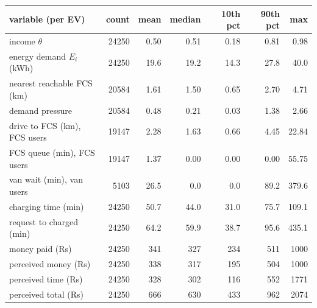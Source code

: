 \begin{tabular}{@{}lrrrrrr@{}}
\toprule
variable (per EV) & count & mean & median & 10th pct & 90th pct & max \\
\midrule
income $\theta$ & 24250 & 0.50 & 0.51 & 0.18 & 0.81 & 0.98 \\
energy demand $E_i$ (kWh) & 24250 & 19.6 & 19.2 & 14.3 & 27.8 & 40.0 \\
nearest reachable FCS (km) & 20584 & 1.61 & 1.50 & 0.65 & 2.70 & 4.71 \\
demand pressure & 20584 & 0.48 & 0.21 & 0.03 & 1.38 & 2.66 \\
drive to FCS (km), FCS users & 19147 & 2.28 & 1.63 & 0.66 & 4.45 & 22.84 \\
FCS queue (min), FCS users & 19147 & 1.37 & 0.00 & 0.00 & 0.00 & 55.75 \\
van wait (min), van users & 5103 & 26.5 & 0.0 & 0.0 & 89.2 & 379.6 \\
charging time (min) & 24250 & 50.7 & 44.0 & 31.0 & 75.7 & 109.1 \\
request to charged (min) & 24250 & 64.2 & 59.9 & 38.7 & 95.6 & 435.1 \\
money paid (Rs) & 24250 & 341 & 327 & 234 & 511 & 1000 \\
perceived money (Rs) & 24250 & 338 & 317 & 195 & 504 & 1000 \\
perceived time (Rs) & 24250 & 328 & 302 & 116 & 552 & 1771 \\
perceived total (Rs) & 24250 & 666 & 630 & 433 & 962 & 2074 \\
\bottomrule
\end{tabular}
